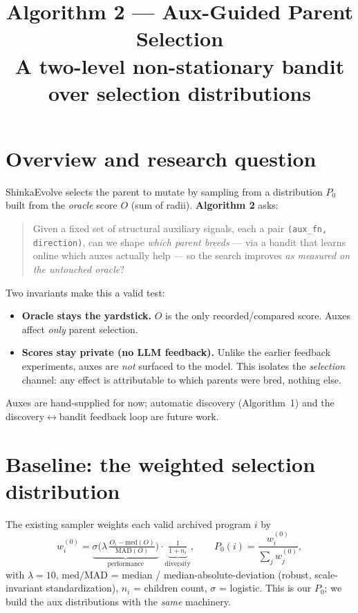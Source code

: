 \documentclass[11pt]{article}
\title{\vspace{-2em}Algorithm 2 --- Aux-Guided Parent Selection\\
\large A two-level non-stationary bandit over selection distributions}
\author{}
\date{}
\newcommand{\code}[1]{\texttt{\small #1}}
\begin{document}
\maketitle
\vspace{-3em}

\section{Overview and research question}
ShinkaEvolve selects the parent to mutate by sampling from a distribution $P_0$ built from the
\emph{oracle} score $O$ (sum of radii). \textbf{Algorithm 2} asks:

\begin{quote}
Given a fixed set of structural auxiliary signals, each a pair \code{(aux\_fn, direction)}, can we
shape \emph{which parent breeds} --- via a bandit that learns online which auxes actually help ---
so the search improves \emph{as measured on the untouched oracle}?
\end{quote}

Two invariants make this a valid test:
\begin{itemize}[nosep]
  \item \textbf{Oracle stays the yardstick.} $O$ is the only recorded/compared score. Auxes affect
        \emph{only} parent selection.
  \item \textbf{Scores stay private (no LLM feedback).} Unlike the earlier feedback experiments,
        auxes are \emph{not} surfaced to the model. This isolates the \emph{selection} channel: any
        effect is attributable to which parents were bred, nothing else.
\end{itemize}
Auxes are hand-supplied for now; automatic discovery (Algorithm~1) and the discovery$\leftrightarrow$bandit
feedback loop are future work.

\section{Baseline: the weighted selection distribution}
The existing sampler weights each valid archived program $i$ by
\[
 w_i^{(0)} = \underbrace{\sigma\!\Big(\lambda\,\tfrac{O_i-\mathrm{med}(O)}{\mathrm{MAD}(O)}\Big)}_{\text{performance}}
 \cdot \underbrace{\tfrac{1}{1+n_i}}_{\text{diversity}},\qquad
 P_0(i)=\frac{w_i^{(0)}}{\sum_j w_j^{(0)}},
\]
with $\lambda=10$, $\mathrm{med}/\mathrm{MAD}$ = median / median-absolute-deviation (robust,
scale-invariant standardization), $n_i$ = children count, $\sigma$ = logistic. This is our $P_0$;
we build the aux distributions with the \emph{same} machinery.
\end{document}
